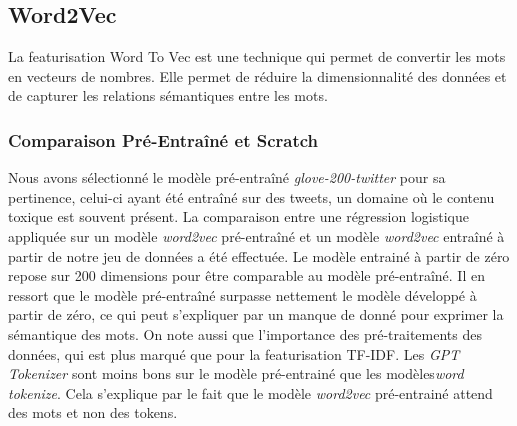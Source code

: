 \subsection{Word2Vec}
La featurisation Word To Vec est une technique qui permet de convertir les mots en vecteurs de nombres. 
Elle permet de réduire la dimensionnalité des données et de capturer les relations sémantiques entre les mots.

\subsubsection{Comparaison Pré-Entraîné et Scratch}
Nous avons sélectionné le modèle pré-entraîné \textit{glove-200-twitter} pour sa pertinence, celui-ci ayant été entraîné sur des tweets, un domaine où le contenu toxique est souvent présent.
La comparaison entre une régression logistique appliquée sur un modèle \textit{word2vec} pré-entraîné et un modèle \textit{word2vec} entraîné à partir de notre jeu de données a été effectuée. 
Le modèle entrainé à partir de zéro repose sur 200 dimensions pour être comparable au modèle pré-entraîné.
Il en ressort que le modèle pré-entraîné surpasse nettement le modèle développé à partir de zéro, ce qui peut s'expliquer par un manque de donné pour exprimer la sémantique des mots.
On note aussi que l'importance des pré-traitements des données, qui est plus marqué que pour la featurisation TF-IDF.
Les \textit{GPT Tokenizer} sont moins bons sur le modèle pré-entrainé que les modèles\textit{word tokenize}. Cela s'explique par le fait que le modèle \textit{word2vec} pré-entrainé attend des mots et non des tokens. 

